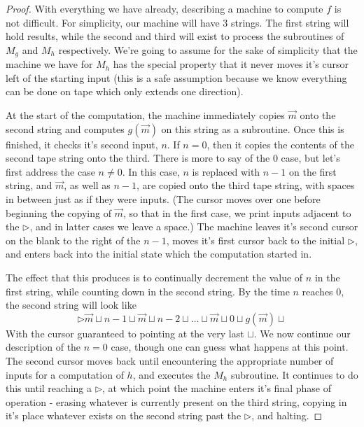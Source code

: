 \documentclass{article}
\theoremstyle{definition}
\theoremstyle{plain}
\theoremstyle{theorem}
\begin{document}
\begin{proof}
    With everything we have already, describing a machine to compute $f$ is not difficult. For simplicity, our machine will have $3$ strings. The first string will hold results, while the second and third will exist to process the subroutines of $M_g$ and $M_h$ respectively. We're going to assume for the sake of simplicity that the machine we have for $M_h$ has the special property that it never moves it's cursor left of the starting input (this is a safe assumption because we know everything can be done on tape which only extends one direction). \par
    At the start of the computation, the machine immediately copies $\vec{m}$ onto the second string and computes $g(\vec{m})$ on this string as a subroutine. Once this is finished, it checks it's second input, $n$. If $n=0$, then it copies the contents of the second tape string onto the third. There is more to say of the $0$ case, but let's first address the case $n \neq 0$. In this case, $n$ is replaced with $n-1$ on the first string, and $\vec{m}$, as well as $n-1$, are copied onto the third tape string, with spaces in between just as if they were inputs. (The cursor moves over one before beginning the copying of $\vec{m}$, so that in the first case, we print inputs adjacent to the $\triangleright$, and in latter cases we leave a space.) The machine leaves it's second cursor on the blank to the right of the $n-1$, moves it's first cursor back to the initial $\triangleright$, and enters back into the initial state which the computation started in. \par
     The effect that this produces is to continually decrement the value of $n$ in the first string, while counting down in the second string. By the time $n$ reaches $0$, the second string will look like 
     \[ \triangleright \vec{m} \sqcup n-1 \sqcup \vec{m} \sqcup n-2 \sqcup \ldots \sqcup \vec{m} \sqcup 0 \sqcup g(\vec{m}) \sqcup \]
    With the cursor guaranteed to pointing at the very last $\sqcup$. We now continue our description of the $n=0$ case, though one can guess what happens at this point. The second cursor moves back until encountering the appropriate number of inputs for a computation of $h$, and executes the $M_h$ subroutine. It continues to do this until reaching a $\triangleright$, at which point the machine enters it's final phase of operation - erasing whatever is currently present on the third string, copying in it's place whatever exists on the second string past the $\triangleright$, and halting.
\end{proof}
\end{document}
